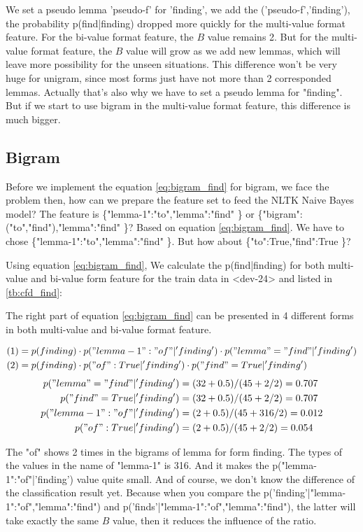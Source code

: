 \documentclass[a4paper]{article}
\begin{document}
We set a pseudo lemma 'pseudo-f' for 'finding', we add the ('pseudo-f','finding'), the probability p(find|finding) dropped more quickly for the multi-value format feature. For the bi-value format feature, the $B$ value remains 2. But for the multi-value format feature, the $B$ value will grow as we add new lemmas, which will leave more possibility for the unseen situations. This difference won't be very huge for unigram, since most forms just have not more than 2 corresponded lemmas. Actually that's also why we have to set a pseudo lemma for "finding". But if we start to use bigram in the multi-value format feature, this difference is much bigger.

\subsection*{Bigram}

Before we implement the equation \ref{eq:bigram_find} for bigram, we face the problem then, how can we prepare the feature set to feed the NLTK Naive Bayes model? The feature is \{"lemma-1":"to","lemma":"find" \} or 
 \{"bigram":("to","find"),"lemma":"find" \}? Based on equation \ref{eq:bigram_find}. We have to chose \{"lemma-1":"to","lemma":"find" \}. But how about \{"to":True,"find":True \}?

Using equation \ref{eq:bigram_find}, We calculate the p(find|finding) for both multi-value and bi-value form feature for the train data in <dev-24> and listed in \ref{tb:cfd_find}:

The right part of equation \ref{eq:bigram_find} can be presented in 4 different forms in both multi-value and bi-value format feature. 

\begin{align*}
&(1)=p(finding) \cdot p("lemma-1":"of"|'finding') \cdot p("lemma"="find"|'finding') \\
&(2)=p(finding) \cdot p("of":True|'finding') \cdot p("find"=True|'finding') 
\end{align*}
\begin{align*}
p("lemma"="find"|'finding') &= (32+0.5)/(45+2/2) = 0.707 \\
p("find"=True|'finding') &= (32+0.5)/(45+2/2) = 0.707 \\
p("lemma-1":"of"|'finding') &= (2+0.5)/(45+316/2) = 0.012 \\
p("of":True|'finding') &= (2+0.5)/(45+2/2) = 0.054 
\end{align*}

The "of" shows 2 times in the bigrams of lemma for form finding. The types of the values in the name of "lemma-1" is 316. And it makes the p("lemma-1":"of"|'finding') value quite small. 
And of course, we don't know the difference of the classification result yet. Because when you compare the p('finding'|"lemma-1":"of","lemma":"find") and p('finds'|"lemma-1":"of","lemma":"find"), the latter will take exactly the same $B$ value, then it reduces the influence of the ratio.
\end{document}
